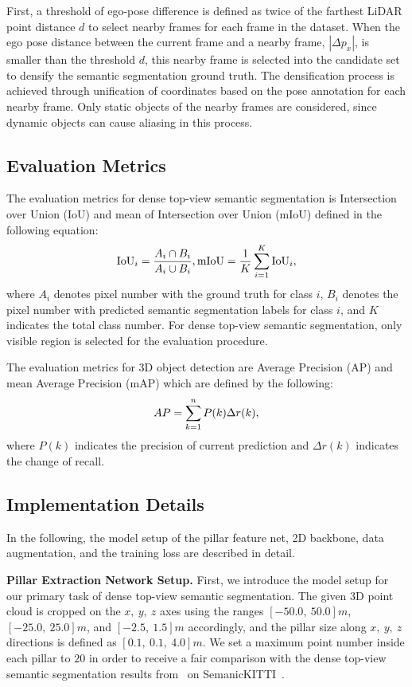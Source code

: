 \documentclass[lettersize,journal]{IEEEtran}
\begin{document}
First, a threshold of ego-pose difference is defined as twice of the farthest LiDAR point distance $d$ to select nearby frames for each frame in the dataset.
When the ego pose distance between the current frame and a nearby frame, $|\Delta p_x|$, is smaller than the threshold $d$, this nearby frame is selected into the candidate set to densify the semantic segmentation ground truth. The densification process is achieved through unification of coordinates based on the pose annotation for each nearby frame. Only static objects of the nearby frames are considered, since dynamic objects can cause aliasing in this process.

\subsection{Evaluation Metrics}

The evaluation metrics for dense top-view semantic segmentation is Intersection over Union (IoU) and mean of Intersection over Union (mIoU) defined in the following equation:
\begin{equation}
\centering
    \mathrm{IoU}_i = \frac{A_i\cap B_i}{A_i \cup B_i}, \mathrm{mIoU} = \frac{1}{K}\sum_{i=1}^K \mathrm{IoU}_i,
\end{equation}
where $A_i$ denotes pixel number with the ground truth for class $i$, $B_i$ denotes the pixel number with predicted semantic segmentation labels for class $i$, and $K$ indicates the total class number. For dense top-view semantic segmentation, only visible region is selected for the evaluation procedure.

The evaluation metrics for 3D object detection are Average Precision (AP) and mean Average Precision (mAP) which are defined by the following:
\begin{equation}
\centering
    AP = \sum_{k=1}^n P(k)\Delta r(k),
\end{equation}
where $P(k)$ indicates the precision of current prediction and $\Delta r(k)$ indicates the change of recall.

\subsection{Implementation Details}
In the following, the model setup of the pillar feature net, 2D backbone, data augmentation, and the training loss are described in detail.

\textbf{Pillar Extraction Network Setup.}
First, we introduce the model setup for our primary task of dense top-view semantic segmentation. The given 3D point cloud is cropped on the $x,~y,~z$ axes using the ranges $[-50.0,~50.0]m$, $[-25.0,~25.0]m$, and $[-2.5,~1.5]m$ accordingly, and the pillar size along $x,~y,~z$ directions is defined as $[0.1,~0.1,~4.0]m$.
We set a maximum point number inside each pillar to $20$ in order to receive a fair comparison with the dense top-view semantic segmentation results from~\cite{bieder2020exploiting} on SemanicKITTI~\cite{semantic_kitti}.
\end{document}
